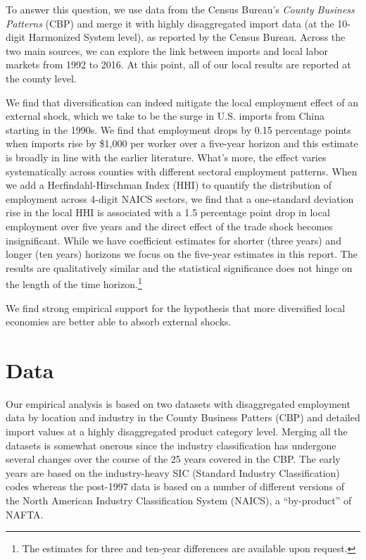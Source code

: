 \documentclass[onehalfspacing,11pt]{article}
\begin{document}
To answer this question, we use data from the Census Bureau's  {\it County Business Patterns} (CBP) and merge it with highly disaggregated import data (at the 10-digit Harmonized System level), as reported by the Census Bureau. Across the two main sources, we can explore the link between imports and local labor markets from 1992 to 2016. At this point, all of our local results are reported at the county level.

We find that diversification can indeed mitigate the local employment effect of an external shock, which we take to be the surge in U.S. imports from China starting in the 1990s. We find that employment drops by 0.15 percentage points when imports rise by \$1,000 per worker over a five-year horizon and this estimate is broadly in line with the earlier literature. What's more, the effect varies systematically across counties with different sectoral employment patterns. When we add a Herfindahl-Hirschman Index (HHI) to quantify the distribution of employment across 4-digit NAICS sectors, we find that a one-standard deviation rise in the local HHI is associated with a 1.5 percentage point drop in local employment over five years and the direct effect of the trade shock becomes insignificant. While we have coefficient estimates for shorter (three years) and longer (ten years) horizons we focus on the five-year estimates in this report. The results are qualitatively similar and the statistical significance does not hinge on the length of the time horizon.\footnote{The estimates for three and ten-year differences are available upon request.}

We find strong empirical support for the hypothesis that more diversified local economies are better able to absorb external shocks.

\section{Data}
Our empirical analysis is based on two datasets with disaggregated employment data by location and industry in the County Business Patters (CBP) and detailed import values at a highly disaggregated product category level. Merging all the datasets is somewhat onerous since the industry classification has undergone several changes over the course of the 25 years covered in the CBP. The early years are based on the industry-heavy SIC (Standard Industry Classification) codes whereas the post-1997 data is based on a number of different versions of the North American Industry Classification System (NAICS), a ``by-product'' of NAFTA.
\end{document}
